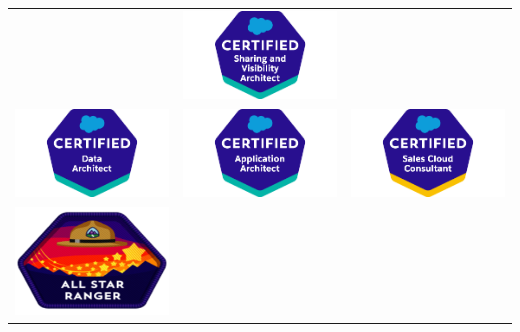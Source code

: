 \documentclass[a4paper, oneside, final]{scrartcl} %
\begin{document}
\begin{center}
\begin{table}[H]
\begin{tabular}{ccc}
                    & \includegraphics[width=0.2\linewidth]{svd.png}\\[-4pt]
                     \includegraphics[width=0.2\linewidth]{da.png}
                    &  \includegraphics[width=0.2\linewidth]{aa.png}
                    & \includegraphics[width=0.2\linewidth]{sales.png}\\[-4pt]
                     \includegraphics[width=0.2\linewidth]{asr.png}
                \end{tabular}%
        \end{table}



\end{center}
\end{document}

